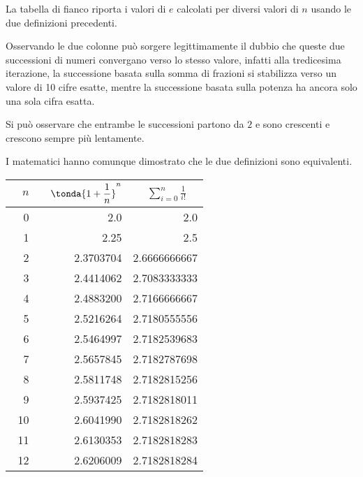 \begin{minipage}{.49\textwidth}
La tabella di fianco riporta i valori di \(e\) calcolati per diversi valori 
di \(n\) usando le due definizioni precedenti.

Osservando le due colonne può sorgere legittimamente il dubbio che queste 
due successioni di numeri convergano verso lo stesso valore, 
infatti alla tredicesima iterazione, la successione 
basata sulla somma di frazioni si stabilizza verso un valore di 10 cifre 
esatte, 
mentre la successione basata sulla potenza ha ancora solo una sola cifra 
esatta.

Si può osservare che entrambe le successioni partono da \(2\) e sono 
crescenti e crescono sempre più lentamente.

I matematici hanno comunque dimostrato che le due definizioni sono 
equivalenti.

\end{minipage}
\hfill
\begin{minipage}{.49\textwidth}
\begin{center}
\begin{tabular}{rrr}
\(\quad n\) &
\(\quad \tonda{1+\dfrac{1}{n}}^n\) &
\(\quad \displaystyle \sum_{i=0}^{n}{\frac{1}{i!}} \quad\)\\
\hline
0 &        2.0 &           2.0 \\
1 &       2.25 &           2.5 \\
2 &  2.3703704 &  2.6666666667 \\
3 &  2.4414062 &  2.7083333333 \\
4 &  2.4883200 &  2.7166666667 \\
5 &  2.5216264 &  2.7180555556 \\
6 &  2.5464997 &  2.7182539683 \\
7 &  2.5657845 &  2.7182787698 \\
8 &  2.5811748 &  2.7182815256 \\
9 &  2.5937425 &  2.7182818011 \\
10 & 2.6041990 &  2.7182818262 \\
11 & 2.6130353 &  2.7182818283 \\
12 & 2.6206009 &  2.7182818284\\
\end{tabular}
\end{center}
\end{minipage}
\vspace{1em}

